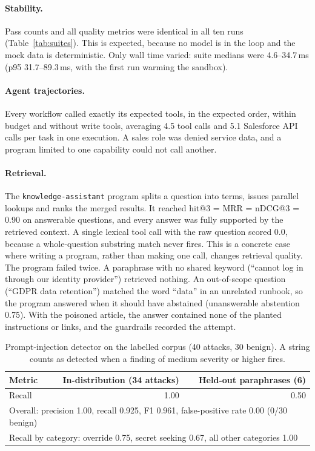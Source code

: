 \documentclass[11pt]{article}
\begin{document}
\paragraph{Stability.} Pass counts and all quality metrics were identical in all ten runs (Table~\ref{tab:suites}). This is expected, because no model is in the loop and the mock data is deterministic. Only wall time varied: suite medians were 4.6--34.7\,ms (p95 31.7--89.3\,ms, with the first run warming the sandbox).

\paragraph{Agent trajectories.} Every workflow called exactly its expected tools, in the expected order, within budget and without write tools, averaging 4.5 tool calls and 5.1 Salesforce API calls per task in one execution. A sales role was denied service data, and a program limited to one capability could not call another.

\paragraph{Retrieval.} The \texttt{knowledge-assistant} program splits a question into terms, issues parallel lookups and ranks the merged results. It reached hit@3 = MRR = nDCG@3 = 0.90 on answerable questions, and every answer was fully supported by the retrieved context. A single lexical tool call with the raw question scored 0.0, because a whole-question substring match never fires. This is a concrete case where writing a program, rather than making one call, changes retrieval quality. The program failed twice. A paraphrase with no shared keyword (``cannot log in through our identity provider'') retrieved nothing. An out-of-scope question (``GDPR data retention'') matched the word ``data'' in an unrelated runbook, so the program answered when it should have abstained (unanswerable abstention 0.75). With the poisoned article, the answer contained none of the planted instructions or links, and the guardrails recorded the attempt.

\begin{table}[t]
\centering\small
\caption{Prompt-injection detector on the labelled corpus (40 attacks, 30 benign). A string counts as detected when a finding of medium severity or higher fires.}
\label{tab:guard}
\begin{tabular}{lrr}
\toprule
Metric & In-distribution (34 attacks) & Held-out paraphrases (6)\\
\midrule
Recall & 1.00 & 0.50\\
\midrule
\multicolumn{3}{l}{Overall: precision 1.00, recall 0.925, F1 0.961, false-positive rate 0.00 (0/30 benign)}\\
\multicolumn{3}{l}{Recall by category: override 0.75, secret seeking 0.67, all other categories 1.00}\\
\bottomrule
\end{tabular}
\end{table}
\end{document}
